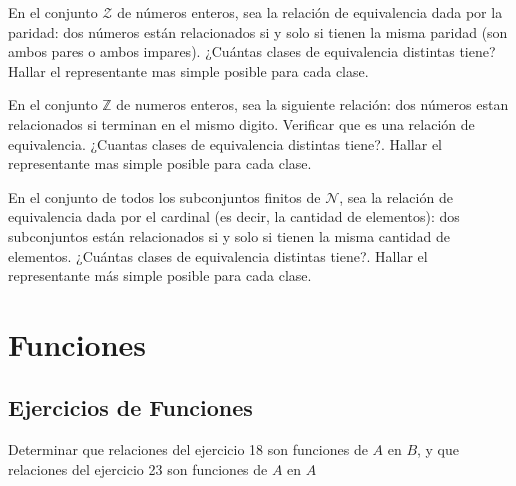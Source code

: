 \documentclass[10pt]{article}
\begin{document}
\begin{ej}
En el conjunto $\mathcal{Z}$ de números enteros, sea la relación de equivalencia dada por la paridad: dos números están relacionados si y solo si tienen la misma paridad (son ambos pares o ambos impares). ¿Cuántas clases de equivalencia distintas tiene? Hallar el representante mas simple posible para cada clase.
\end{ej}

\begin{ej}
En el conjunto $\mathbb{Z}$ de numeros enteros, sea la siguiente relación: dos números estan relacionados si terminan en el mismo digito. Verificar que es una relación de equivalencia. ¿Cuantas clases de equivalencia distintas tiene?. Hallar el representante mas simple posible para cada clase. 
\end{ej}

\begin{ej}
En el conjunto de todos los subconjuntos finitos de $\mathcal{N}$, sea la relación de equivalencia dada por el cardinal (es decir, la cantidad de elementos): dos subconjuntos están relacionados si y solo si tienen la misma cantidad de elementos. ¿Cuántas clases de equivalencia distintas tiene?. Hallar el representante más simple posible para cada clase.
\end{ej}
\newpage
\section{Funciones}

\subsection{Ejercicios de Funciones}
\begin{ej}
Determinar que relaciones del ejercicio 18 son funciones de $A$ en $B$, y que relaciones del ejercicio 23 son funciones de $A$ en $A$
\end{ej}
\end{document}

